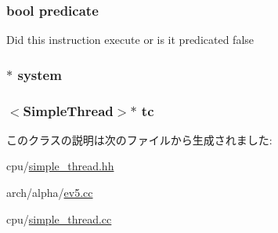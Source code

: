 \label{classSimpleThread_abcb37ddc11515555d8484702697bc4bb}
\hypertarget{classSimpleThread_afbb4c93008d44e809c143bbe5021d16e}{
\subsubsection[{predicate}]{\setlength{\rightskip}{0pt plus 5cm}bool {\bf predicate}}}
\label{classSimpleThread_afbb4c93008d44e809c143bbe5021d16e}
Did this instruction execute or is it predicated false \hypertarget{classSimpleThread_af27ccd765f13a4b7bd119dc7579e2746}{
\subsubsection[{system}]{$\ast$ {\bf system}}}
\label{classSimpleThread_af27ccd765f13a4b7bd119dc7579e2746}
\hypertarget{classSimpleThread_a922168dc0855a866d2ed033338c1ca27}{
\subsubsection[{tc}]{$<${\bf SimpleThread}$>$$\ast$ {\bf tc}}}
\label{classSimpleThread_a922168dc0855a866d2ed033338c1ca27}


このクラスの説明は次のファイルから生成されました:\begin{DoxyCompactItemize}
\item 
cpu/\hyperlink{simple__thread_8hh}{simple\_\-thread.hh}\item 
arch/alpha/\hyperlink{ev5_8cc}{ev5.cc}\item 
cpu/\hyperlink{simple__thread_8cc}{simple\_\-thread.cc}\end{DoxyCompactItemize}
